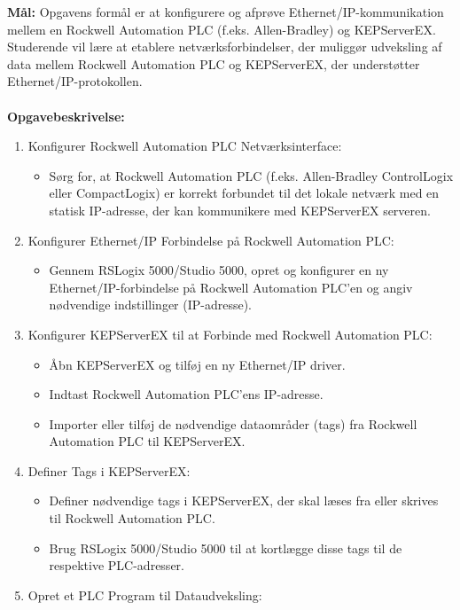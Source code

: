 \textbf{Mål:} Opgavens formål er at konfigurere og afprøve Ethernet/IP-kommunikation mellem en Rockwell Automation PLC (f.eks. Allen-Bradley) og KEPServerEX. Studerende vil lære at etablere netværksforbindelser, der muliggør udveksling af data mellem Rockwell Automation PLC og KEPServerEX, der understøtter Ethernet/IP-protokollen.
\\\\
\noindent\textbf{Opgavebeskrivelse:}
\begin{enumerate}
	\item Konfigurer Rockwell Automation PLC Netværksinterface:
	\begin{itemize}
		\item Sørg for, at Rockwell Automation PLC (f.eks. Allen-Bradley ControlLogix eller CompactLogix) er korrekt forbundet til det lokale netværk med en statisk IP-adresse, der kan kommunikere med KEPServerEX serveren.
	\end{itemize}
	\item Konfigurer Ethernet/IP Forbindelse på Rockwell Automation PLC:
	\begin{itemize}
		\item Gennem RSLogix 5000/Studio 5000, opret og konfigurer en ny Ethernet/IP-forbindelse på Rockwell Automation PLC'en og angiv nødvendige indstillinger (IP-adresse).
	\end{itemize}
	\item Konfigurer KEPServerEX til at Forbinde med Rockwell Automation PLC:
	\begin{itemize}
		\item Åbn KEPServerEX og tilføj en ny Ethernet/IP driver.
		\item Indtast Rockwell Automation PLC’ens IP-adresse.
		\item Importer eller tilføj de nødvendige dataområder (tags) fra Rockwell Automation PLC til KEPServerEX.
	\end{itemize}
	\item Definer Tags i KEPServerEX:
	\begin{itemize}
		\item Definer nødvendige tags i KEPServerEX, der skal læses fra eller skrives til Rockwell Automation PLC.
		\item Brug RSLogix 5000/Studio 5000 til at kortlægge disse tags til de respektive PLC-adresser.
	\end{itemize}
	\item Opret et PLC Program til Dataudveksling:
	\begin{itemize}

\end{itemize}
\end{enumerate}
